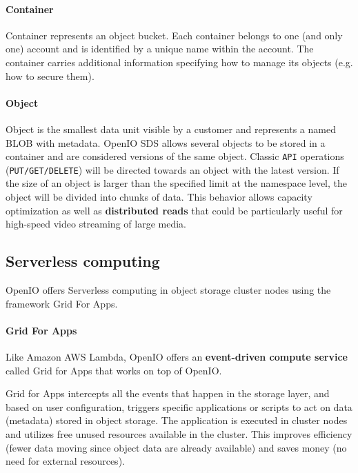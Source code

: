     \paragraph{Container}
    Container represents an object bucket. Each container belongs to one (and only one) account and is identified by a unique name within the account. The container carries additional information specifying how to manage its objects (e.g. how to secure them)\cite{oioCoreSolution}.

    \paragraph{Object}
    Object is the smallest data unit visible by a customer and represents a named BLOB with metadata. OpenIO SDS allows several objects to be stored in a container and are considered versions of the same object. Classic \texttt{API} operations (\texttt{PUT/GET/DELETE}) will be directed towards an object with the latest version. If the size of an object is larger than the specified limit at the namespace level, the object will be divided into chunks of data. This behavior allows capacity optimization as well as \textbf{distributed reads} that could be particularly useful for high-speed video streaming of large media\cite{oioCoreSolution}.


    \subsection{Serverless computing}
    OpenIO offers Serverless computing in object storage cluster nodes using the framework Grid For Apps.
    \paragraph{Grid For Apps}\label{sec:oioGridForApps}

    Like Amazon AWS Lambda, OpenIO offers an \textbf{event-driven compute service} called Grid for Apps that works on top of OpenIO.

    Grid for Apps intercepts all the events that happen in the storage layer, and based on user configuration, triggers specific applications or scripts to act on data (metadata) stored in object storage\cite{oioNextGen}. The application is executed in cluster nodes and utilizes free unused resources available in the cluster. This improves efficiency (fewer data moving since object data are already available) and saves money (no need for external resources)\cite{oioNextGen}.

